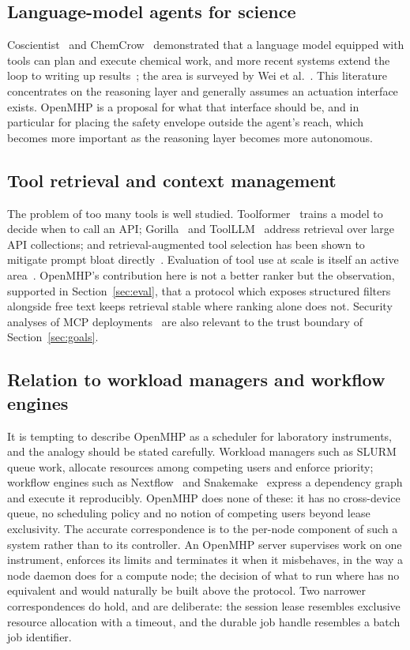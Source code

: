 \documentclass[11pt]{article}
\begin{document}
\subsection{Language-model agents for science}
Coscientist~\cite{boiko2023} and ChemCrow~\cite{bran2024} demonstrated that a language
model equipped with tools can plan and execute chemical work, and more recent systems
extend the loop to writing up results~\cite{lu2024}; the area is surveyed by Wei et
al.~\cite{wei2025}. This literature concentrates on the reasoning layer and generally
assumes an actuation interface exists. OpenMHP is a proposal for what that interface
should be, and in particular for placing the safety envelope outside the agent's reach,
which becomes more important as the reasoning layer becomes more autonomous.

\subsection{Tool retrieval and context management}
The problem of too many tools is well studied. Toolformer~\cite{schick2023} trains a model
to decide when to call an API; Gorilla~\cite{patil2024} and ToolLLM~\cite{qin2024} address
retrieval over large API collections; and retrieval-augmented tool selection has been shown
to mitigate prompt bloat directly~\cite{gan2025,lumer2024}. Evaluation of tool use at scale
is itself an active area~\cite{patil2025}. OpenMHP's contribution here is not a better
ranker but the observation, supported in Section~\ref{sec:eval}, that a protocol which
exposes structured filters alongside free text keeps retrieval stable where ranking alone
does not. Security analyses of MCP deployments~\cite{hou2025} are also relevant to the
trust boundary of Section~\ref{sec:goals}.

\subsection{Relation to workload managers and workflow engines}
It is tempting to describe OpenMHP as a scheduler for laboratory instruments, and the
analogy should be stated carefully. Workload managers such as SLURM~\cite{yoo2003} queue
work, allocate resources among competing users and enforce priority; workflow engines such
as Nextflow~\cite{ditommaso2017} and Snakemake~\cite{molder2021} express a dependency graph
and execute it reproducibly. OpenMHP does none of these: it has no cross-device queue, no
scheduling policy and no notion of competing users beyond lease exclusivity. The accurate
correspondence is to the per-node component of such a system rather than to its controller.
An OpenMHP server supervises work on one instrument, enforces its limits and terminates it
when it misbehaves, in the way a node daemon does for a compute node; the decision of what
to run where has no equivalent and would naturally be built above the protocol. Two
narrower correspondences do hold, and are deliberate: the session lease resembles exclusive
resource allocation with a timeout, and the durable job handle resembles a batch job
identifier.
\end{document}
